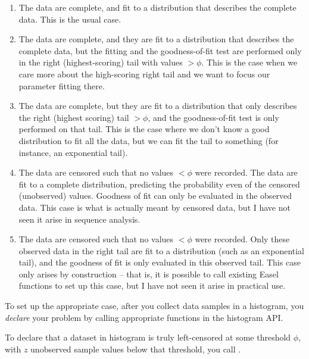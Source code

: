 \begin{enumerate}
\item The data are complete, and fit to a distribution that describes the
      complete data. This is the usual case.

\item The data are complete, and they are fit to a distribution that
      describes the complete data, but the fitting and the
      goodness-of-fit test are performed only in the right
      (highest-scoring) tail with values $> \phi$. This is the case
      when we care more about the high-scoring right tail and we want
      to focus our parameter fitting there.

\item The data are complete, but they are fit to a distribution that
      only describes the right (highest scoring) tail $> \phi$, and
      the goodness-of-fit test is only performed on that tail. This
      is the case where we don't know a good distribution to fit all
      the data, but we can fit the tail to something (for instance, an
      exponential tail).

\item The data are censored such that no values $< \phi$ were
      recorded. The data are fit to a complete distribution,
      predicting the probability even of the censored (unobserved)
      values. Goodness of fit can only be evaluated in the observed
      data. This case is what is actually meant by censored data, but
      I have not seen it arise in sequence analysis.

\item The data are censored such that no values $< \phi$ were
      recorded. Only these observed data in the right tail are fit to
      a distribution (such as an exponential tail), and the goodness of fit
      is only evaluated in this observed tail. This case only
      arises by construction -- that is, it is possible to call existing
      Easel functions to set up this case, but I have not seen it
      arise in practical use.
\end{enumerate}

To set up the appropriate case, after you collect data samples in a
histogram, you \emph{declare} your problem by calling appropriate
functions in the histogram API.

To declare that a dataset in histogram  is truly
left-censored at some threshold $\phi$, with $z$ unobserved sample
values below that threshold, you call
. 

